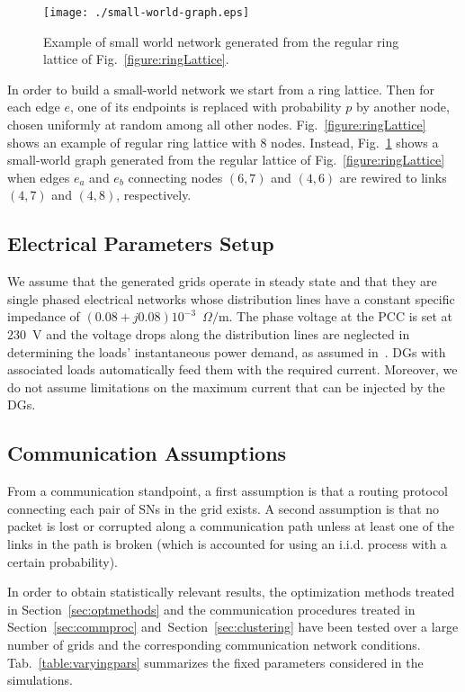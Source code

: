 \documentclass[journal]{IEEEtran}
\newcommand{\fig}[1]{Fig.~\ref{#1}}
\newcommand{\tab}[1]{Tab.~\ref{#1}}
\newcommand{\secref}[1]{Section~\ref{#1}}
\begin{document}
\begin{figure}
\centering
\texttt{[image: ./small-world-graph.eps]}
\caption{Example of small world network generated from the regular ring lattice of \fig{figure:ringLattice}.\label{figure:smallworld}}
\end{figure}

In order to build a small-world network we start from a ring lattice. Then for each edge $e$, one of its endpoints is replaced with probability $p$ by another node, chosen uniformly at random among all other nodes. \fig{figure:ringLattice} shows an example of regular ring lattice with $8$ nodes. Instead, \fig{figure:smallworld} shows a small-world graph generated from the regular lattice of \fig{figure:ringLattice} when edges $e_a$ and $e_b$ connecting nodes $(6,7)$ and $(4,6)$ are rewired to links $(4,7)$ and $(4,8)$, respectively.

\subsection{Electrical Parameters Setup}
\label{ssec:parameters}

We assume that the generated grids operate in steady state and that they are single phased electrical networks whose distribution lines have a constant specific impedance of $(0.08+j0.08)10^{-3}$~$\Omega/\text{m}$. The phase voltage at the PCC is set at $230$~V and the voltage drops along the distribution lines are neglected in determining the loads' instantaneous power demand, as assumed in~\cite{SurroundControl}. DGs with associated loads  automatically feed them with the required current. Moreover, we do not assume limitations on the maximum current that can be injected by the DGs.

\subsection{Communication Assumptions}

\label{ssec:commassumptions}
From a communication standpoint, a first assumption is that a routing protocol connecting each pair of SNs in the grid exists. A second assumption is that no packet is lost or corrupted along a communication path unless at least one of the links in the path is broken (which is accounted for using an i.i.d. process with a certain probability).

\label{ssec:statgeneration}
In order to obtain statistically relevant results, the optimization methods treated in \secref{sec:optmethods} and the communication procedures treated in \secref{sec:commproc} and~\secref{sec:clustering} have been tested over a large number of grids and the corresponding communication network conditions. \tab{table:varyingpars} summarizes the fixed parameters considered in the simulations.
\end{document}
